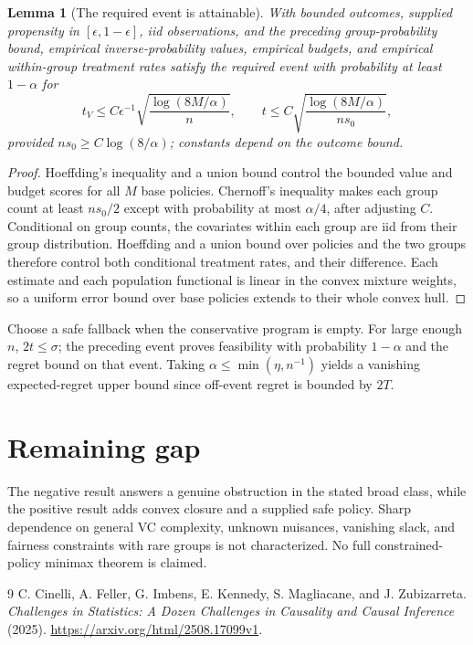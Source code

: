 \documentclass[11pt]{article}
\newtheorem{lemma}[theorem]{Lemma}
\theoremstyle{remark}
\begin{document}
\begin{lemma}[The required event is attainable]
With bounded outcomes, supplied propensity in $[\epsilon,1-\epsilon]$, iid observations, and the preceding group-probability bound, empirical inverse-probability values, empirical budgets, and empirical within-group treatment rates satisfy the required event with probability at least $1-\alpha$ for
\[
 t_V\le C\epsilon^{-1}\sqrt{\frac{\log(8M/\alpha)}n},\qquad
 t\le C\sqrt{\frac{\log(8M/\alpha)}{ns_0}},
\]
provided $ns_0\ge C\log(8/\alpha)$; constants depend on the outcome bound.
\end{lemma}
\begin{proof}
Hoeffding's inequality and a union bound control the bounded value and budget scores for all $M$ base policies. Chernoff's inequality makes each group count at least $ns_0/2$ except with probability at most $\alpha/4$, after adjusting $C$. Conditional on group counts, the covariates within each group are iid from their group distribution. Hoeffding and a union bound over policies and the two groups therefore control both conditional treatment rates, and their difference. Each estimate and each population functional is linear in the convex mixture weights, so a uniform error bound over base policies extends to their whole convex hull.
\end{proof}
Choose a safe fallback when the conservative program is empty. For large enough $n$, $2t\le\sigma$; the preceding event proves feasibility with probability $1-\alpha$ and the regret bound on that event. Taking $\alpha\le\min(\eta,n^{-1})$ yields a vanishing expected-regret upper bound since off-event regret is bounded by $2T$.

\section*{Remaining gap}
The negative result answers a genuine obstruction in the stated broad class, while the positive result adds convex closure and a supplied safe policy. Sharp dependence on general VC complexity, unknown nuisances, vanishing slack, and fairness constraints with rare groups is not characterized. No full constrained-policy minimax theorem is claimed.

\begin{thebibliography}{9}
 C. Cinelli, A. Feller, G. Imbens, E. Kennedy, S. Magliacane, and J. Zubizarreta. \emph{Challenges in Statistics: A Dozen Challenges in Causality and Causal Inference} (2025). \url{https://arxiv.org/html/2508.17099v1}.
\end{thebibliography}
\end{document}
